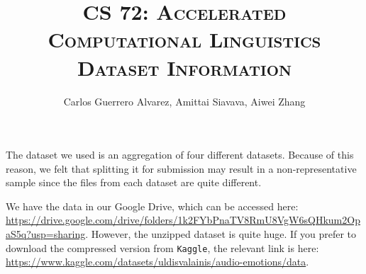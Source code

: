 \title{
  \Huge{\textsc{CS 72: Accelerated Computational Linguistics}}\\
  \small{\textsc{Dataset Information}}
}

\date{\Large{}}

\begin{titlingpage}

  \author{
    \Large{Carlos Guerrero Alvarez},
    \Large{Amittai Siavava},
    \Large{Aiwei Zhang}
  }

  \maketitle

  The dataset we used is an aggregation of four different datasets.
  Because of this reason, we felt that splitting it for submission
  may result in a non-representative sample
  since the files from each dataset are quite different.

  We have the data in our Google Drive, which can be accessed here: \\
  \url{https://drive.google.com/drive/folders/1k2FYbPnaTV8RmU8VgW6sQHkum2OpaS5q?usp=sharing}.
  However, the unzipped dataset is quite huge.
  If you prefer to download the compressed version from \verb|Kaggle|,
  the relevant link is here:
  \url{https://www.kaggle.com/datasets/uldisvalainis/audio-emotions/data}.
\end{titlingpage}
